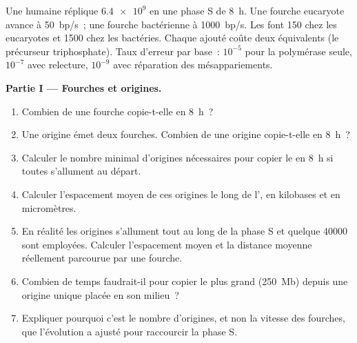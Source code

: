 \begin{problem}
\label{pb:b1:replication-mitosis:1}
Une  humaine réplique $\num{6.4e9}$  en une phase
S de \qty{8}{h}. Une fourche eucaryote avance à \qty{50}{bp/s}~; une
fourche bactérienne à \qty{1000}{bp/s}. Les  font
\qty{150}{}  chez les eucaryotes et \qty{1500}{} chez les
bactéries. Chaque  ajouté coûte deux équivalents  (le
précurseur triphosphate). Taux d'erreur par base~: $10^{-5}$ pour la
polymérase seule, $10^{-7}$ avec relecture, $10^{-9}$ avec réparation
des mésappariements.

\medskip
\noindent\textbf{Partie I --- Fourches et origines.}
\begin{enumerate}
  \item Combien de  une fourche copie-t-elle en
        \qty{8}{h}~?
  \item Une origine émet deux fourches. Combien de  une
        origine copie-t-elle en \qty{8}{h}~?
  \item Calculer le nombre minimal d'origines nécessaires pour copier le
         en \qty{8}{h} si toutes s'allument au départ.
  \item Calculer l'espacement moyen de ces origines le long de l', en
        kilobases et en micromètres.
  \item En réalité les origines s'allument tout au long de la phase S et
        quelque \num{40000} sont employées. Calculer l'espacement moyen
        et la distance moyenne réellement parcourue par une fourche.
  \item Combien de temps faudrait-il pour copier le plus grand
         (\qty{250}{Mb}) depuis une origine unique placée en
        son milieu~?
  \item Expliquer pourquoi c'est le nombre d'origines, et non la vitesse
        des fourches, que l'évolution a ajusté pour raccourcir la phase
        S.
\end{enumerate}


\end{problem}
